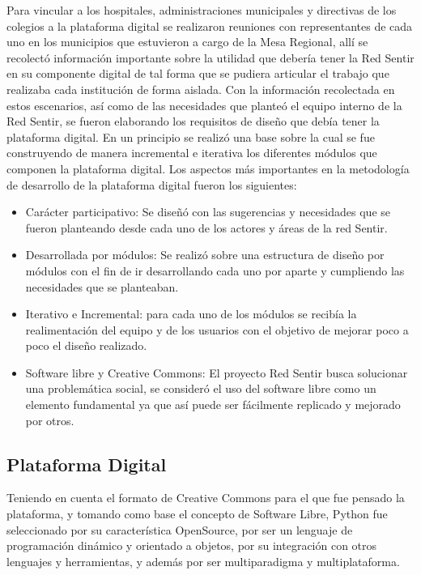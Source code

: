 \documentclass[journal,transmag]{IEEEtran}
\begin{document}
Para vincular a los hospitales, administraciones municipales y directivas de los colegios a la plataforma digital se realizaron reuniones con representantes de cada uno en los municipios que estuvieron a cargo de la Mesa Regional, allí se recolectó información importante sobre la utilidad que debería tener la Red Sentir en su componente digital de tal forma que se pudiera articular el trabajo que realizaba cada institución de forma aislada. Con la información recolectada en estos escenarios, así como de las necesidades que planteó el equipo interno de la Red Sentir, se fueron elaborando los requisitos de diseño que debía tener la plataforma digital. En un principio se realizó una base sobre la cual se fue construyendo de manera incremental e iterativa los diferentes módulos que componen la plataforma digital. Los aspectos más importantes en la metodología de desarrollo de la plataforma digital fueron los siguientes:

\begin{itemize}
\item Carácter participativo: Se diseñó con las sugerencias y necesidades que se fueron planteando desde cada uno de los actores y áreas de la red Sentir.

\item Desarrollada por módulos: Se realizó sobre una estructura de diseño por módulos con el fin de ir desarrollando cada uno por aparte y cumpliendo las necesidades que se planteaban.

\item Iterativo e Incremental: para cada uno de los módulos se recibía la realimentación del equipo y de los usuarios con el objetivo de mejorar poco a poco el diseño realizado.

\item Software libre y Creative Commons: El proyecto Red Sentir busca solucionar una problemática social, se consideró el uso del software libre como un elemento fundamental ya que así puede ser fácilmente replicado y mejorado por otros.
\end{itemize}

\subsection{Plataforma Digital}
Teniendo en cuenta el formato de Creative Commons para el que fue pensado la plataforma, y tomando como base el concepto de Software Libre, Python fue seleccionado por su característica OpenSource, por ser un lenguaje de programación dinámico y orientado a objetos, por su integración con otros lenguajes y herramientas, y además por ser multiparadigma y multiplataforma.
\end{document}
